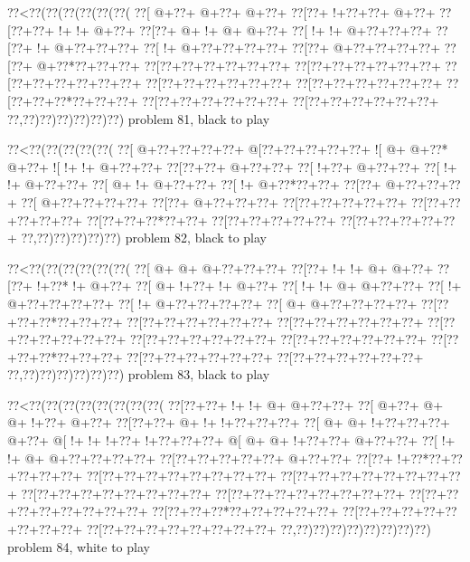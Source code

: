 \vbox{\vbox{\goo
\0??<\0??(\0??(\0??(\0??(\0??(\0??(
\0??[\- @+\0??+\- @+\0??+\- @+\0??+
\0??[\0??+\- !+\0??+\0??+\- @+\0??+
\0??[\0??+\0??+\- !+\- !+\- @+\0??+
\0??[\0??+\- @+\- !+\- @+\- @+\0??+
\0??[\- !+\- !+\- @+\0??+\0??+\0??+
\0??[\0??+\- !+\- @+\0??+\0??+\0??+
\0??[\- !+\- @+\0??+\0??+\0??+\0??+
\0??[\0??+\- @+\0??+\0??+\0??+\0??+
\0??[\0??+\- @+\0??*\0??+\0??+\0??+
\0??[\0??+\0??+\0??+\0??+\0??+\0??+
\0??[\0??+\0??+\0??+\0??+\0??+\0??+
\0??[\0??+\0??+\0??+\0??+\0??+\0??+
\0??[\0??+\0??+\0??+\0??+\0??+\0??+
\0??[\0??+\0??+\0??+\0??+\0??+\0??+
\0??[\0??+\0??+\0??*\0??+\0??+\0??+
\0??[\0??+\0??+\0??+\0??+\0??+\0??+
\0??[\0??+\0??+\0??+\0??+\0??+\0??+
\0??,\0??)\0??)\0??)\0??)\0??)\0??)
}
\hfil problem 81, black to play\hfil\break
}

\vbox{\vbox{\goo
\0??<\0??(\0??(\0??(\0??(\0??(
\0??[\- @+\0??+\0??+\0??+\0??+
\- @[\0??+\0??+\0??+\0??+\0??+
\- ![\- @+\- @+\0??*\- @+\0??+
\- ![\- !+\- !+\- @+\0??+\0??+
\0??[\0??+\0??+\- @+\0??+\0??+
\0??[\- !+\0??+\- @+\0??+\0??+
\0??[\- !+\- !+\- @+\0??+\0??+
\0??[\- @+\- !+\- @+\0??+\0??+
\0??[\- !+\- @+\0??*\0??+\0??+
\0??[\0??+\- @+\0??+\0??+\0??+
\0??[\- @+\0??+\0??+\0??+\0??+
\0??[\0??+\- @+\0??+\0??+\0??+
\0??[\0??+\0??+\0??+\0??+\0??+
\0??[\0??+\0??+\0??+\0??+\0??+
\0??[\0??+\0??+\0??*\0??+\0??+
\0??[\0??+\0??+\0??+\0??+\0??+
\0??[\0??+\0??+\0??+\0??+\0??+
\0??,\0??)\0??)\0??)\0??)\0??)
}
\hfil problem 82, black to play\hfil\break
}

\vbox{\vbox{\goo
\0??<\0??(\0??(\0??(\0??(\0??(\0??(
\0??[\- @+\- @+\- @+\0??+\0??+\0??+
\0??[\0??+\- !+\- !+\- @+\- @+\0??+
\0??[\0??+\- !+\0??*\- !+\- @+\0??+
\0??[\- @+\- !+\0??+\- !+\- @+\0??+
\0??[\- !+\- !+\- @+\- @+\0??+\0??+
\0??[\- !+\- @+\0??+\0??+\0??+\0??+
\0??[\- !+\- @+\0??+\0??+\0??+\0??+
\0??[\- @+\- @+\0??+\0??+\0??+\0??+
\0??[\0??+\0??+\0??*\0??+\0??+\0??+
\0??[\0??+\0??+\0??+\0??+\0??+\0??+
\0??[\0??+\0??+\0??+\0??+\0??+\0??+
\0??[\0??+\0??+\0??+\0??+\0??+\0??+
\0??[\0??+\0??+\0??+\0??+\0??+\0??+
\0??[\0??+\0??+\0??+\0??+\0??+\0??+
\0??[\0??+\0??+\0??*\0??+\0??+\0??+
\0??[\0??+\0??+\0??+\0??+\0??+\0??+
\0??[\0??+\0??+\0??+\0??+\0??+\0??+
\0??,\0??)\0??)\0??)\0??)\0??)\0??)
}
\hfil problem 83, black to play\hfil\break
}

\vbox{\vbox{\goo
\0??<\0??(\0??(\0??(\0??(\0??(\0??(\0??(\0??(
\0??[\0??+\0??+\- !+\- !+\- @+\- @+\0??+\0??+
\0??[\- @+\0??+\- @+\- @+\- !+\0??+\- @+\0??+
\0??[\0??+\0??+\- @+\- !+\- !+\0??+\0??+\0??+
\0??[\- @+\- @+\- !+\0??+\0??+\0??+\- @+\0??+
\- @[\- !+\- !+\- !+\0??+\- !+\0??+\0??+\0??+
\- @[\- @+\- @+\- !+\0??+\0??+\- @+\0??+\0??+
\0??[\- !+\- !+\- @+\- @+\0??+\0??+\0??+\0??+
\0??[\0??+\0??+\0??+\0??+\0??+\- @+\0??+\0??+
\0??[\0??+\- !+\0??*\0??+\0??+\0??+\0??+\0??+
\0??[\0??+\0??+\0??+\0??+\0??+\0??+\0??+\0??+
\0??[\0??+\0??+\0??+\0??+\0??+\0??+\0??+\0??+
\0??[\0??+\0??+\0??+\0??+\0??+\0??+\0??+\0??+
\0??[\0??+\0??+\0??+\0??+\0??+\0??+\0??+\0??+
\0??[\0??+\0??+\0??+\0??+\0??+\0??+\0??+\0??+
\0??[\0??+\0??+\0??*\0??+\0??+\0??+\0??+\0??+
\0??[\0??+\0??+\0??+\0??+\0??+\0??+\0??+\0??+
\0??[\0??+\0??+\0??+\0??+\0??+\0??+\0??+\0??+
\0??,\0??)\0??)\0??)\0??)\0??)\0??)\0??)\0??)
}
\hfil problem 84, white to play\hfil\break
}

